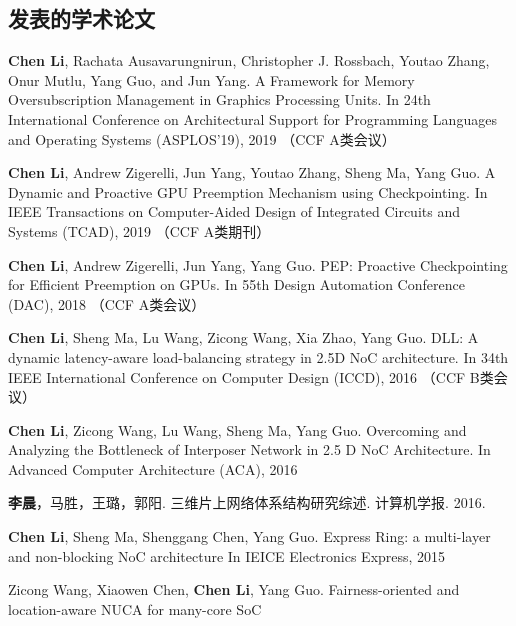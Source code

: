 \begin{resume}

\section*{发表的学术论文} %

  \begin{enumerate}[{[}1{]}]
  \addtolength{\itemsep}{-0.36\baselineskip}
  \settowidth{}
  \setlength{\labelsep}{0.4em}
  \setlength{\itemindent}{\labelwidth+\labelsep+0.4em}
  \setlength{\leftmargin}{0em}
  \addtolength{\itemsep}{-.36\baselineskip}%
  \item \textbf{Chen Li}, Rachata Ausavarungnirun, Christopher J. Rossbach, Youtao Zhang, Onur Mutlu, Yang Guo, and Jun Yang. A Framework for Memory Oversubscription Management in Graphics Processing Units.
        In 24th International Conference on Architectural Support for Programming Languages and Operating Systems (ASPLOS'19), 2019 （CCF A类会议）
  \item \textbf{Chen Li}, Andrew Zigerelli, Jun Yang, Youtao Zhang, Sheng Ma, Yang Guo. A Dynamic and Proactive GPU Preemption Mechanism using Checkpointing.
        In IEEE Transactions on Computer-Aided Design of Integrated Circuits and Systems (TCAD), 2019 （CCF A类期刊）
  \item \textbf{Chen Li}, Andrew Zigerelli, Jun Yang, Yang Guo. PEP: Proactive Checkpointing for Efficient Preemption on GPUs.
        In 55th Design Automation Conference (DAC), 2018 （CCF A类会议）
  \item \textbf{Chen Li}, Sheng Ma, Lu Wang, Zicong Wang, Xia Zhao, Yang Guo. DLL: A dynamic latency-aware load-balancing strategy in 2.5D NoC architecture.
        In 34th IEEE International Conference on Computer Design (ICCD), 2016 （CCF B类会议）
  \item \textbf{Chen Li}, Zicong Wang, Lu Wang, Sheng Ma, Yang Guo. Overcoming and Analyzing the Bottleneck of Interposer Network in 2.5 D NoC Architecture.
        In Advanced Computer Architecture (ACA), 2016
  \item \textbf{李晨}，马胜，王璐，郭阳. 三维片上网络体系结构研究综述. 计算机学报. 2016.  
  \item \textbf{Chen Li}, Sheng Ma, Shenggang Chen, Yang Guo. Express Ring: a multi-layer and non-blocking NoC architecture
        In IEICE Electronics Express, 2015
  \item Zicong Wang, Xiaowen Chen, \textbf{Chen Li}, Yang Guo. Fairness-oriented and location-aware NUCA for many-core SoC

\end{enumerate}
\end{resume}
